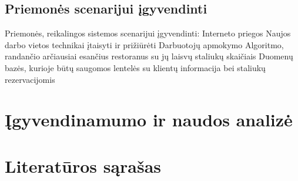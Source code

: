 \documentclass{VUMIFPSkursinis}
\begin{document}
\subsection{Priemonės scenarijui įgyvendinti}

Priemonės, reikalingos sistemos scenarijui įgyvendinti:
Interneto priegos
Naujos darbo vietos technikai įtaisyti ir prižiūrėti
Darbuotojų apmokymo
Algoritmo, randančio arčiausiai esančius restoranus su jų laisvų staliukų skaičiais
Duomenų bazės, kurioje būtų saugomos lentelės su klientų informacija bei staliukų rezervacijomis


\section{Įgyvendinamumo ir naudos analizė}

\section{Literatūros sąrašas}
\end{document}

